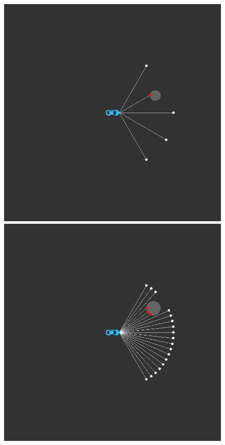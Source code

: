 \documentclass[a4paper,12pt]{article}
\begin{document}
            \begin{figure}[H]
            \centering
            \begin{minipage}[t]{.5\textwidth}
                \centering
                \includegraphics[width=1\linewidth]{data/rays1.png}
            \end{minipage}%
            \begin{minipage}[t]{.5\textwidth}
                \centering
                \includegraphics[width=1\linewidth]{data/rays2.png}
            \end{minipage}
            \label{fig:rays}
            \end{figure}
\end{document}
